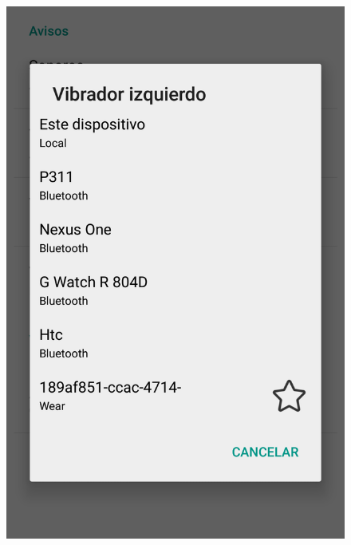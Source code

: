 \begin{slide}
\begin{center}
\begin{minipage}[b]{0.3\linewidth}
\begin{center}
\begin{figure}
          \includegraphics[height=0.65\textheight]{img/naviganto-opcioneslistadispositivos.png}
        \end{figure}
      \end{center}
    \end{minipage}
    \begin{minipage}[b]{0.3\linewidth}
      \begin{center}
        \begin{figure}

\end{figure}
\end{center}
\end{minipage}
\end{center}
\end{slide}
